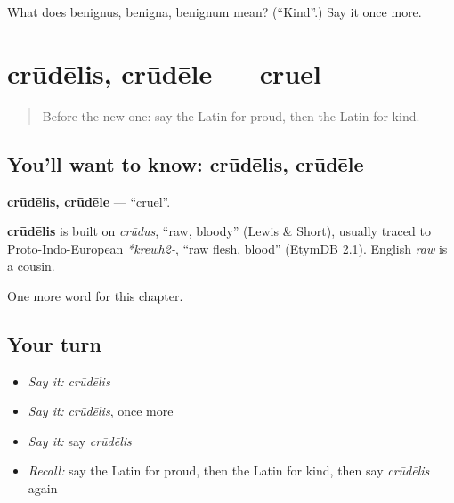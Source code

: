 \begin{tcolorbox}[breakable,colback=teal!4,colframe=teal!35!black,title={Before you move on}]
What does benignus, benigna, benignum mean? (\textquotedblleft{}Kind\textquotedblright{}.) Say it once more.
\end{tcolorbox}
\section[crūdēlis, crūdēle]{crūdēlis, crūdēle — cruel}

\label{lesson:LA-C151-crudelis}



\begin{quote}
Before the new one: say the Latin for proud, then the Latin for kind.
\end{quote}

\subsection*{You'll want to know: crūdēlis, crūdēle}
\textbf{crūdēlis, crūdēle} — \textquotedblleft{}cruel\textquotedblright{}.

\begin{cousinweb}
\textbf{crūdēlis} is built on \emph{crūdus}, \textquotedblleft{}raw, bloody\textquotedblright{} (Lewis \& Short), usually traced to Proto-Indo-European \emph{*krewh2-}, \textquotedblleft{}raw flesh, blood\textquotedblright{} (EtymDB 2.1). English \emph{raw} is a cousin.
\end{cousinweb}

\begin{grammarlens}[title={What you've built}]
One more word for this chapter.
\end{grammarlens}

\subsection*{Your turn}
\begin{itemize}
\raggedright
  \item \emph{Say it:} \emph{crūdēlis}
  \item \emph{Say it:} \emph{crūdēlis}, once more
  \item \emph{Say it:} say \emph{crūdēlis}
  \item \emph{Recall:} say the Latin for proud, then the Latin for kind, then say \emph{crūdēlis} again
\end{itemize}

